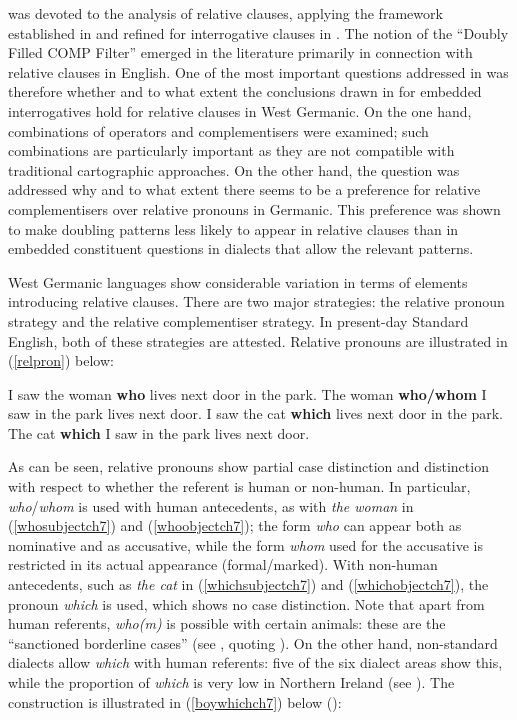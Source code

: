  was devoted to the analysis of relative clauses, applying the framework established in  and refined for interrogative clauses in . The notion of the ``Doubly Filled COMP Filter'' emerged in the literature primarily in connection with relative clauses in English. One of the most important questions addressed in  was therefore whether and to what extent the conclusions drawn in  for embedded interrogatives hold for relative clauses in West Germanic. On the one hand, combinations of operators and complementisers were examined; such combinations are particularly important as they are not compatible with traditional cartographic approaches. On the other hand, the question was addressed why and to what extent there seems to be a preference for relative complementisers over relative pronouns in Germanic. This preference was shown to make doubling patterns less likely to appear in relative clauses than in embedded constituent questions in dialects that allow the relevant patterns. 

West Germanic languages show considerable variation in terms of elements introducing relative clauses. There are two major strategies: the relative pronoun strategy and the relative complementiser strategy. In present-day Standard English, both of these strategies are attested. Relative pronouns are illustrated in (\ref{relpron}) below:

\ea \label{relpron}
\ea I saw the woman \textbf{who} lives next door in the park. \label{whosubjectch7}
\ex The woman \textbf{who/whom} I saw in the park lives next door. \label{whoobjectch7}
\ex I saw the cat \textbf{which} lives next door in the park. \label{whichsubjectch7}
\ex The cat \textbf{which} I saw in the park lives next door. \label{whichobjectch7}
\z
\z

As can be seen, relative pronouns show partial case distinction and distinction with respect to whether the referent is human or non-human. In particular, \textit{who}/\textit{whom} is used with human antecedents, as with \textit{the woman} in (\ref{whosubjectch7}) and (\ref{whoobjectch7}); the form \textit{who} can appear both as nominative and as accusative, while the form \textit{whom} used for the accusative is restricted in its actual appearance (formal/marked). With non-human antecedents, such as \textit{the cat} in (\ref{whichsubjectch7}) and (\ref{whichobjectch7}), the pronoun \textit{which} is used, which shows no case distinction. Note that apart from human referents, \textit{who(m)} is possible with certain animals: these are the ``sanctioned borderline cases'' (see \citealt[41]{herrmann2005}, quoting \citealt{quirkgreenbaumleechsvartvik1985}). On the other hand, non-standard dialects allow \textit{which} with human referents: five of the six dialect areas show this, while the proportion of \textit{which} is very low in Northern Ireland (see \citealt[41]{herrmann2005}). The construction is illustrated in (\ref{boywhichch7}) below (\citealt[42, ex. 4a]{herrmann2005}):

